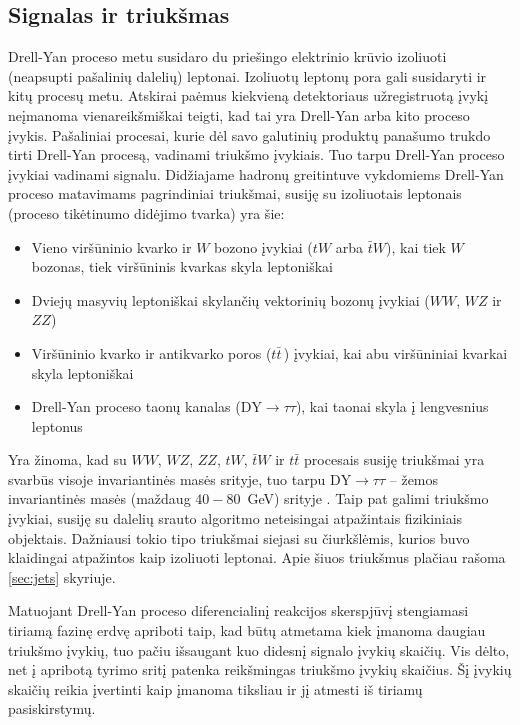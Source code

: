 \documentclass[a4paper, 12pt, oneside]{article}
\newcommand{\ZZ}{Z\! Z}
\newcommand{\WZ}{W\! Z}
\newcommand{\tbarW}{\bar{t}W}
\newcommand{\ttbar}{t\bar{t}}
\newcommand{\DYtau}{\mathrm{DY} \! \rightarrow \! \tau\tau}
\begin{document}
\subsection{Signalas ir triukšmas}\label{sec:sig_bkg}
Drell-Yan proceso metu susidaro du priešingo elektrinio krūvio izoliuoti (neapsupti pašalinių dalelių) leptonai.
Izoliuotų leptonų pora gali susidaryti ir kitų procesų metu.
Atskirai paėmus kiekvieną detektoriaus užregistruotą įvykį neįmanoma vienareikšmiškai teigti, kad tai yra Drell-Yan
arba kito proceso įvykis.
Pašaliniai procesai, kurie dėl savo galutinių produktų panašumo trukdo tirti Drell-Yan procesą, vadinami triukšmo įvykiais.
Tuo tarpu Drell-Yan proceso įvykiai vadinami signalu.
Didžiajame hadronų greitintuve vykdomiems Drell-Yan proceso matavimams pagrindiniai triukšmai, susiję su izoliuotais
leptonais (proceso tikėtinumo didėjimo tvarka) yra šie:
\begin{itemize}
	\item Vieno viršūninio kvarko ir $W$ bozono įvykiai ($tW$ arba $\tbarW$), kai tiek $W$ bozonas, tiek viršūninis kvarkas
	skyla leptoniškai
	\item Dviejų masyvių leptoniškai skylančių vektorinių bozonų įvykiai ($WW$, $\WZ$ ir $\ZZ$)	
	\item Viršūninio kvarko ir antikvarko poros ($\ttbar\,$) įvykiai, kai abu viršūniniai kvarkai skyla leptoniškai
	\item Drell-Yan proceso taonų kanalas ($\DYtau$), kai taonai skyla į lengvesnius leptonus
\end{itemize}
Yra žinoma, kad su $WW$, $\WZ$, $\ZZ$, $tW$, $\tbarW$ ir $\ttbar$ procesais susiję triukšmai yra svarbūs visoje invariantinės
masės srityje, tuo tarpu $\DYtau$ -- žemos invariantinės masės (maždaug $40-80$~GeV) srityje
\cite{DY_CMS2011, DY_CMS2013, DY_CMS2015, DY_CMS2019}.
Taip pat galimi triukšmo įvykiai, susiję su dalelių srauto algoritmo neteisingai atpažintais fizikiniais objektais.
Dažniausi tokio tipo triukšmai siejasi su čiurkšlėmis, kurios buvo klaidingai atpažintos kaip izoliuoti leptonai.
Apie šiuos triukšmus plačiau rašoma \ref{sec:jets} skyriuje.

Matuojant Drell-Yan proceso diferencialinį reakcijos skerspjūvį stengiamasi tiriamą fazinę erdvę apriboti taip, kad būtų
atmetama kiek įmanoma daugiau triukšmo įvykių, tuo pačiu išsaugant kuo didesnį signalo įvykių skaičių.
Vis dėlto, net į apribotą tyrimo sritį patenka reikšmingas triukšmo įvykių skaičius.
Šį įvykių skaičių reikia įvertinti kaip įmanoma tiksliau ir jį atmesti iš tiriamų pasiskirstymų.
\end{document}
